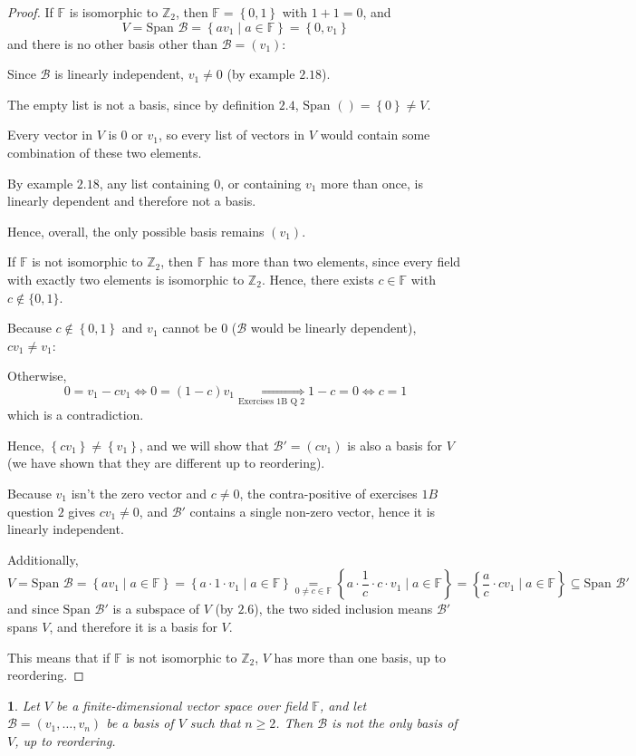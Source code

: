 \documentclass[english]{article}
\theoremstyle{definition}
\theoremstyle{plain}
\theoremstyle{remark}
\theoremstyle{plain}
\theoremstyle{plain}
\newtheorem{lem}[thm]{\protect\lemmaname}
\providecommand{\lemmaname}{Lemma}
\begin{document}
\begin{proof}
If $\mathbb{F}$ is isomorphic to $\mathbb{Z}_{2}$, then $\mathbb{F}=\left\{ 0,1\right\} $
with $1+1=0$, and
\[
V=\text{Span }\mathcal{B}=\left\{ av_{1}\mid a\in\mathbb{F}\right\} =\left\{ 0,v_{1}\right\} 
\]
and there is no other basis other than $\mathcal{B}=\left(v_{1}\right)$:

Since $\mathcal{B}$ is linearly independent, $v_{1}\ne0$ (by example
$2.18$).

The empty list is not a basis, since by definition $2.4$, $\text{Span }\left(\right)=\left\{ 0\right\} \ne V$.

Every vector in $V$ is $0$ or $v_{1}$, so every list of vectors
in $V$ would contain some combination of these two elements.

By example $2.18$, any list containing $0$, or containing $v_{1}$
more than once, is linearly dependent and therefore not a basis.

Hence, overall, the only possible basis remains $\left(v_{1}\right)$.

If $\mathbb{F}$ is not isomorphic to $\mathbb{Z}_{2}$, then $\mathbb{F}$
has more than two elements, since every field with exactly two elements
is isomorphic to $\mathbb{Z}_{2}$. Hence, there exists $c\in\mathbb{F}$
with $c\notin\{0,1\}$.

Because $c\notin\left\{ 0,1\right\} $ and $v_{1}$ cannot be $0$
($\mathcal{B}$ would be linearly dependent), $cv_{1}\ne v_{1}$:

Otherwise, 
\[
0=v_{1}-cv_{1}\iff0=\left(1-c\right)v_{1}\underset{\text{Exercises 1B Q 2}}{\iff}1-c=0\iff c=1
\]
which is a contradiction.

Hence, $\left\{ cv_{1}\right\} \ne\left\{ v_{1}\right\} $, and we
will show that $\mathcal{B}'=\left(cv_{1}\right)$ is also a basis
for $V$ (we have shown that they are different up to reordering). 

Because $v_{1}$ isn't the zero vector and $c\ne0$, the contra-positive
of exercises $1B$ question $2$ gives $cv_{1}\ne0$, and $\mathcal{B}'$
contains a single non-zero vector, hence it is linearly independent.

Additionally, 
\[
V=\text{Span }\mathcal{B}=\left\{ av_{1}\mid a\in\mathbb{F}\right\} =\left\{ a\cdot1\cdot v_{1}\mid a\in\mathbb{F}\right\} \underset{0\ne c\in\mathbb{F}}{=}\left\{ a\cdot\frac{1}{c}\cdot c\cdot v_{1}\mid a\in\mathbb{F}\right\} =\left\{ \frac{a}{c}\cdot cv_{1}\mid a\in\mathbb{F}\right\} \subseteq\text{Span }\mathcal{B}'
\]
and since $\text{Span }\mathcal{B}'$ is a subspace of $V$ (by $2.6$),
the two sided inclusion means $\mathcal{B}'$ spans $V$, and therefore
it is a basis for $V$.

This means that if $\mathbb{F}$ is not isomorphic to $\mathbb{Z}_{2}$,
$V$ has more than one basis, up to reordering.
\end{proof}
\newpage{}
\begin{lem}
Let $V$ be a finite-dimensional vector space over field $\mathbb{F}$,
and let $\mathcal{B}=\left(v_{1},\dots,v_{n}\right)$ be a basis of
$V$ such that $n\ge2$. Then $\mathcal{B}$ is not the only basis
of $V$, up to reordering. 
\end{lem}
\end{document}

